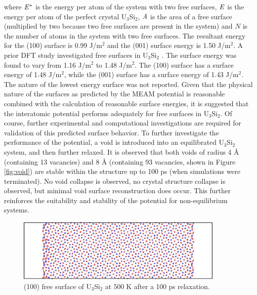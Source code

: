 \documentclass[review]{elsarticle}
\begin{document}
where $\it{E^{*}}$ is the energy per atom of the system with two free surfaces, $\it{E}$ is the energy per atom of the perfect crystal U$_{3}$Si$_{2}$, $\it{A}$ is the area of a free surface (multiplied by two because two free surfaces are present in the system) and $\textit{N}$ is the number of atoms in the system with two free surfaces.  The resultant energy for the (100) surface is 0.99 J/m$^{2}$ and the (001) surface energy is 1.50 J/m$^{2}$.  A prior DFT study investigated free surfaces in U$_{3}$Si$_{2}$ \cite{anl_report}.  The surface energy was found to vary from 1.16 J/m$^{2}$ to 1.48 J/m$^{2}$.  The (100) surface has a surface energy of 1.48 J/m$^{2}$, while the (001) surface has a surface energy of 1.43 J/m$^{2}$.  The nature of the lowest energy surface was not reported.  Given that the physical nature of the surfaces as predicted by the MEAM potential is reasonable combined with the calculation of reasonable surface energies, it is suggested that the interatomic potential performs adequately for free surfaces in U$_{3}$Si$_{2}$.  Of course, further experimental and computational investigations are required for validation of this predicted surface behavior.  To further investigate the performance of the potential, a void is introduced into an equilibrated U$_{3}$Si$_{2}$ system, and then further relaxed.  It is observed that both voids of radius 4 {\AA} (containing 13 vacancies) and 8 {\AA} (containing 93 vacancies, shown in Figure \ref{fig:void}) are stable within the structure up to 100 ps (when simulations were terminated).  No void collapse is observed, no crystal structure collapse is observed, but minimal void surface reconstruction does occur.  This further reinforces the suitability and stability of the potential for non-equilibrium systems.

\begin{figure}[bt]
	\centering
	\includegraphics[width=0.9\textwidth]{100surface500k.png}
    \caption{(100) free surface of U$_{3}$Si$_{2}$ at 500 K after a 100 ps relaxation.}\label{fig:ben7}
\end{figure}
\end{document}
